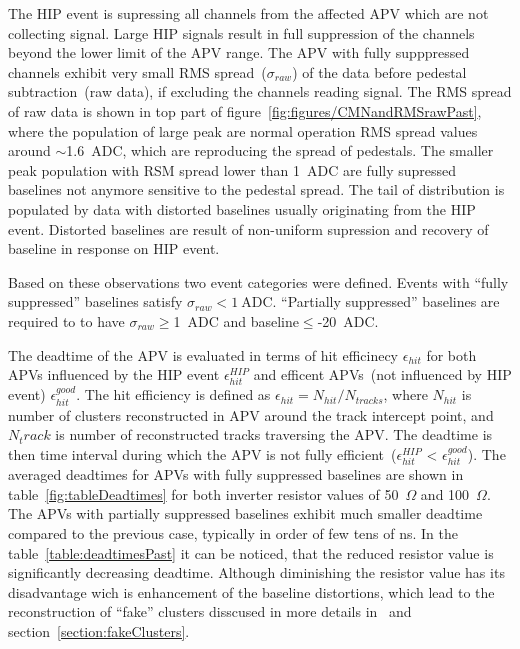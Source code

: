 The HIP event is supressing all channels from the affected APV which are not collecting signal. Large HIP signals result in full suppression of the channels beyond the lower limit of the APV range. The APV with fully supppressed channels exhibit very small RMS spread~($\sigma_{raw}$) of the data before pedestal subtraction~(raw data), if excluding the channels reading signal. The RMS spread of raw data is shown in top part of figure~\ref{fig:figures/CMNandRMSrawPast}, where the population of large peak are normal operation RMS spread values around $\sim$1.6~ADC, which are reproducing the spread of pedestals. The smaller peak population with RSM spread lower than 1~ADC are fully supressed baselines not anymore sensitive to the pedestal spread. The tail of distribution is populated by data with distorted baselines usually originating from the HIP event. Distorted baselines are result of non-uniform supression and recovery of baseline in response on HIP event.

Based on these observations two event categories were defined. Events with ``fully suppressed'' baselines satisfy $\sigma_{raw}< 1~\mathrm{ADC}$. ``Partially suppressed'' baselines are required to to have $\sigma_{raw}\geq$1~ADC and baseline$\leq$-20~ADC.


The deadtime of the APV is evaluated in terms of hit efficinecy $\epsilon_{hit}$ for both APVs influenced by the HIP event $\epsilon_{hit}^{HIP}$ and efficent APVs~(not influenced by HIP event) $\epsilon_{hit}^{good}$. The hit efficiency is defined as $\epsilon_{hit} = N_{hit}/N_{tracks}$, where $N_{hit}$ is number of clusters reconstructed in APV around the track intercept point, and $N_track$ is number of reconstructed tracks traversing the APV. The deadtime is then time interval during which the APV is not fully efficient~($\epsilon_{hit}^{HIP}$ < $\epsilon_{hit}^{good}$). The averaged deadtimes for APVs with fully suppressed baselines are shown in table~\ref{fig:tableDeadtimes} for both inverter resistor values of 50~$\Omega$ and 100~$\Omega$. The APVs with partially suppressed baselines exhibit much smaller deadtime compared to the previous case, typically in order of few tens of ns. In the table~\ref{table:deadtimesPast} it can be noticed, that the reduced resistor value is significantly decreasing deadtime. Although diminishing the resistor value has its disadvantage wich is enhancement of the baseline distortions, which lead to the reconstruction of ``fake'' clusters disscused in more details in~\cite{Bainbridge:2004jc} and section~\ref{section:fakeClusters}.

